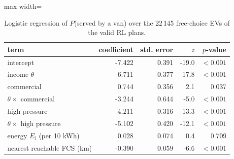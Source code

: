 \begin{table}[H]\centering
\small
\caption{Logistic regression of $P$(served by a van) over the 22\,145 free-choice EVs of the valid RL plans.}\label{tab:logit}
\begin{adjustbox}{max width=\textwidth}\begin{tabular}{lrrrr}\toprule
term & coefficient & std. error & $z$ & $p$-value \\ \midrule
intercept & -7.422 & 0.391 & -19.0 & $<0.001$ \\
income $\theta$ & 6.711 & 0.377 & 17.8 & $<0.001$ \\
commercial & 0.744 & 0.356 & 2.1 & 0.037 \\
$\theta\times$ commercial & -3.244 & 0.644 & -5.0 & $<0.001$ \\
high pressure & 4.211 & 0.316 & 13.3 & $<0.001$ \\
$\theta\times$ high pressure & -5.102 & 0.420 & -12.1 & $<0.001$ \\
energy $E_i$ (per 10 kWh) & 0.028 & 0.074 & 0.4 & 0.709 \\
nearest reachable FCS (km) & -0.390 & 0.059 & -6.6 & $<0.001$ \\
\bottomrule\end{tabular}\end{adjustbox}\end{table}
